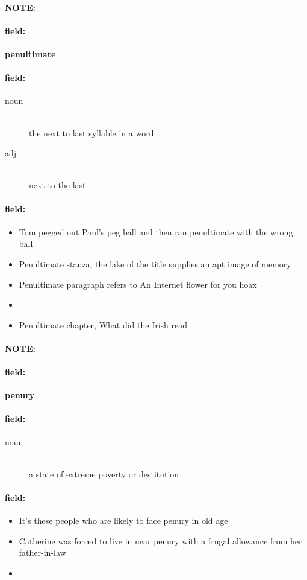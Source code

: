 \documentclass[12pt]{article}
\newenvironment{note}{\paragraph{NOTE:}}{}
\newenvironment{field}{\paragraph{field:}}{}
\begin{document}
\begin{note}
\begin{field}
\textbf{\large penultimate}
\end{field}


\begin{field}
\begin{description}
\item[noun] \hfill \\ 
the next to last syllable in a word

\item[adj] \hfill \\ 
next to the last

\end{description}
\end{field}

\begin{field}
\begin{itemize}
\item Tom pegged out Paul's peg ball and then ran penultimate with the wrong ball
\item Penultimate stanza, the lake of the title supplies an apt image of memory
\item Penultimate paragraph refers to An Internet flower for you hoax
\item 
\item Penultimate chapter, What did the Irish read
\end{itemize}
\end{field}
\end{note}
\begin{note}
\begin{field}
\textbf{\large penury}
\end{field}


\begin{field}
\begin{description}
\item[noun] \hfill \\ 
a state of extreme poverty or destitution

\end{description}
\end{field}

\begin{field}
\begin{itemize}
\item It's these people who are likely to face penury in old age
\item Catherine was forced to live in near penury with a frugal allowance from her father-in-law
\item 
\end{itemize}
\end{field}
\end{note}
\end{document}
